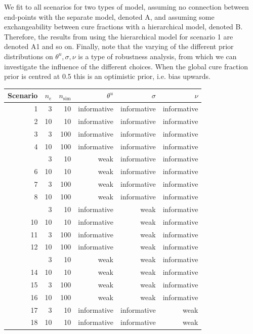 \documentclass[AMA,STIX1COL]{WileyNJD-v2}
\begin{document}
We fit to all scenarios for two types of model, assuming no connection between end-points with the separate model, denoted A, and assuming some exchangeability between cure fractions with a hierarchical model, denoted B. Therefore, the results from using the hierarchical model for scenario 1 are denoted A1 and so on.
Finally, note that the varying of the different prior distributions on $\theta^{u}, \sigma, \nu$ is a type of robustness analysis, from which we can investigate the influence of the different choices. When the global cure fraction prior is centred at 0.5 this is an optimistic prior, i.e. bias upwards.

\begin{table}[htbp!]
\centering
\begin{tabular}{rrrrrr}
\toprule
Scenario & $n_e$ & $n_{\text{sim}}$ & $\theta^{u}$ & $\sigma$ & $\nu$\\
\midrule
1 & 3 & 10 & informative & informative & informative\\
2 & 10 & 10 & informative & informative & informative\\
3 & 3 & 100 & informative & informative & informative\\
4 & 10 & 100 & informative & informative & informative\\
\addlinespace
5 & 3 & 10 & weak & informative & informative\\
6 & 10 & 10 & weak & informative & informative\\
7 & 3 & 100 & weak & informative & informative\\
8 & 10 & 100 & weak & informative & informative\\
\addlinespace
9 & 3 & 10 & informative & weak & informative\\
10 & 10 & 10 & informative & weak & informative\\
11 & 3 & 100 & informative & weak & informative\\
12 & 10 & 100 & informative & weak & informative\\
\addlinespace
13 & 3 & 10 & weak & weak & informative\\
14 & 10 & 10 & weak & weak & informative\\
15 & 3 & 100 & weak & weak & informative\\
16 & 10 & 100 & weak & weak & informative\\
17 & 3 & 10 & informative & informative & weak\\
18 & 10 & 10 & informative & informative & weak\\

\end{tabular}
\end{table}
\end{document}
